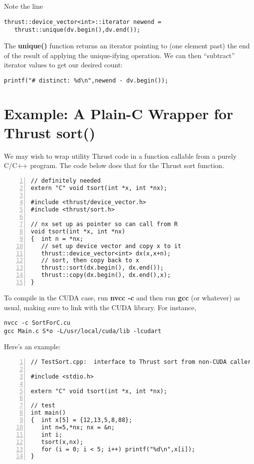 Note the line

\begin{lstlisting}
thrust::device_vector<int>::iterator newend = 
   thrust::unique(dv.begin(),dv.end());
\end{lstlisting}

The {\bf unique()} function returns an iterator pointing to (one element
past) the end of the result of applying the unique-ifying operation.  We
can then ``subtract'' iterator values to get our desired count:

\begin{lstlisting}
printf("# distinct: %d\n",newend - dv.begin());
\end{lstlisting}

\section{Example:  A Plain-C Wrapper for Thrust sort()}

We may wish to wrap utility Thrust code in a function callable from a
purely C/C++ program.  The code below does that for the Thrust sort
function.  

\begin{lstlisting}[numbers=left]
// definitely needed
extern "C" void tsort(int *x, int *nx);

#include <thrust/device_vector.h>
#include <thrust/sort.h>

// nx set up as pointer so can call from R
void tsort(int *x, int *nx)
{  int n = *nx;
   // set up device vector and copy x to it
   thrust::device_vector<int> dx(x,x+n);
   // sort, then copy back to x
   thrust::sort(dx.begin(), dx.end());
   thrust::copy(dx.begin(), dx.end(),x);
}
\end{lstlisting}

To compile in the CUDA case, run {\bf nvcc -c} and then run {\bf gcc}
(or whatever) as usual, making sure to link with the CUDA library.  For
instance,

\begin{lstlisting}
nvcc -c SortForC.cu
gcc Main.c S*o -L/usr/local/cuda/lib -lcudart
\end{lstlisting}

Here's an example:

\begin{lstlisting}[numbers=left]
// TestSort.cpp:  interface to Thrust sort from non-CUDA callers

#include <stdio.h>

extern "C" void tsort(int *x, int *nx);

// test
int main()
{  int x[5] = {12,13,5,8,88};  
   int n=5,*nx; nx = &n; 
   int i;
   tsort(x,nx);
   for (i = 0; i < 5; i++) printf("%d\n",x[i]);
}
\end{lstlisting}

